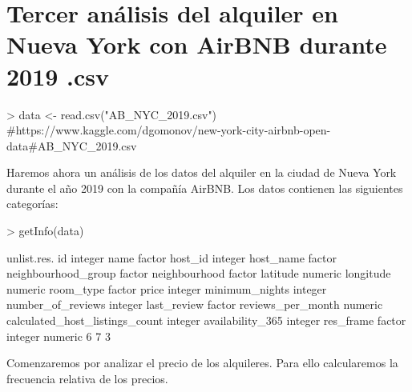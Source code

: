 \documentclass [a4paper] {article}
\begin{document}
\section{Tercer análisis del alquiler en Nueva York con AirBNB durante 2019 .csv}

\begin{Schunk}
\begin{Sinput}
> data <- read.csv("AB_NYC_2019.csv") #https://www.kaggle.com/dgomonov/new-york-city-airbnb-open-data#AB_NYC_2019.csv
\end{Sinput}
\end{Schunk}

Haremos ahora un análisis de los datos del alquiler en la ciudad de Nueva York durante el año 2019 con la compañía AirBNB.
Los datos contienen las siguientes categorías:
\begin{Schunk}
\begin{Sinput}
> getInfo(data)
\end{Sinput}
\begin{Soutput}
                               unlist.res.
id                                 integer
name                                factor
host_id                            integer
host_name                           factor
neighbourhood_group                 factor
neighbourhood                       factor
latitude                           numeric
longitude                          numeric
room_type                           factor
price                              integer
minimum_nights                     integer
number_of_reviews                  integer
last_review                         factor
reviews_per_month                  numeric
calculated_host_listings_count     integer
availability_365                   integer
res_frame
 factor integer numeric 
      6       7       3 
\end{Soutput}
\end{Schunk}
Comenzaremos por analizar el precio de los alquileres.
Para ello calcularemos la frecuencia relativa de los precios.
\begin{Schunk}
\end{Schunk}
\end{document}
